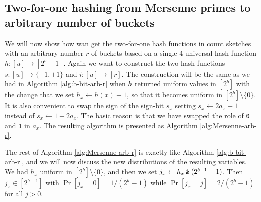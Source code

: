\subsection{Two-for-one hashing from Mersenne primes to arbitrary number of buckets}
We will now show how wan get the two-for-one hash functions in count
sketches with an arbitrary number $r$ of buckets based on a single
$4$-universal hash function $h:[u]\to [2^b-1]$.  Again we want to
construct the two hash functions $s:[u]\to\{-1,+1\}$ and
$i:[u]\to[r]$.  The construction will be the same as we had in
Algorithm \ref{alg:b-bit-arb-r} when $h$ returned uniform values in
$[2^b]$ with the change that we set $h_x\gets h(x)+1$, so that it
becomes uniform in $[2^b]\setminus\{0\}$. It is also convenient to
swap the sign of the sign-bit $s_x$ setting $s_x\gets 2a_x+1$ instead
of $s_x\gets 1-2a_x$. The basic reason is that we have swapped the
role of \texttt{0} and \texttt{1} in $a_x$.  The resulting algorithm
is presented as Algorithm \ref{alg:Mersenne-arb-r}.
The rest of Algorithm \ref{alg:Mersenne-arb-r} is exactly like 
Algorithm \ref{alg:b-bit-arb-r}, and we will now discuss the new
distributions of the resulting variables. We had
$h_x$ uniform in $[2^b]\setminus\{0\}$, and then we set
$j_x \gets h_x\mathbin{\texttt{\&}}(2^{b-1}-1)$. Then $j_x\in[2^{b-1}]$ with 
$\Pr[j_x=0]=1/(2^{b}-1)$ while  $\Pr[j_x=j]=2/(2^{b}-1)$ for all $j>0$.

